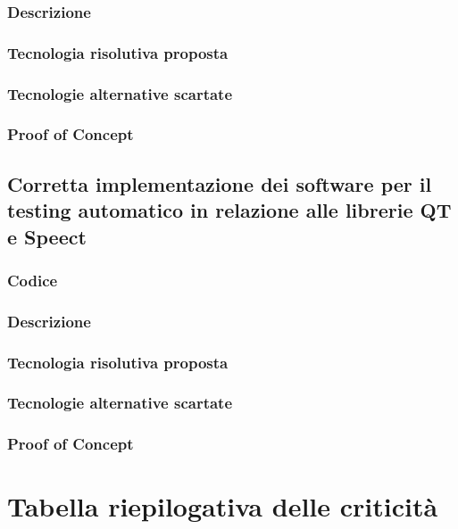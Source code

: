 \documentclass[./../Technology Baseline.tex]{subfiles}
\begin{document}
\subsubsection{Descrizione}

\subsubsection{Tecnologia risolutiva proposta}

\subsubsection{Tecnologie alternative scartate}

\subsubsection{Proof of Concept}

\subsection{Corretta implementazione dei software per il testing automatico in relazione alle librerie QT e Speect}

\subsubsection{Codice}

\subsubsection{Descrizione}

\subsubsection{Tecnologia risolutiva proposta}

\subsubsection{Tecnologie alternative scartate}

\subsubsection{Proof of Concept}

\section{Tabella riepilogativa delle criticità}
\end{document}
